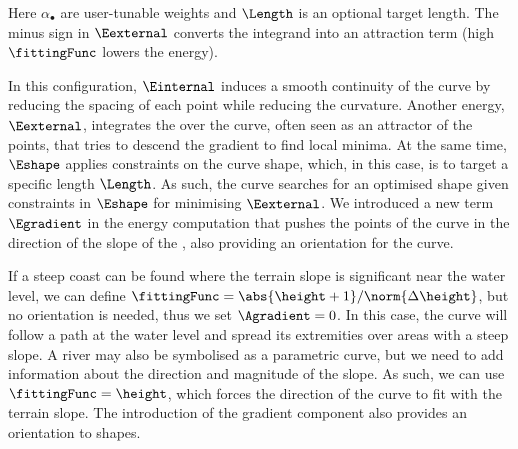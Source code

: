 Here $\alpha_{\bullet}$ are user-tunable weights and $\Length$ is an optional target length. The minus sign in $\Eexternal$ converts the integrand into an attraction term (high $\fittingFunc$ lowers the energy).

In this configuration, $\Einternal$ induces a smooth continuity of the curve by reducing the spacing of each point while reducing the curvature. Another energy, $\Eexternal$, integrates the  over the curve, often seen as an attractor of the points, that tries to descend the gradient to find local minima. At the same time, $\Eshape$ applies constraints on the curve shape, which, in this case, is to target a specific length $\Length$. As such, the curve searches for an optimised shape given constraints in $\Eshape$ for minimising $\Eexternal$. We introduced a new term $\Egradient$ in the energy computation that pushes the points of the curve in the direction of the slope of the , also providing an orientation for the curve.

If a steep coast can be found where the terrain slope is significant near the water level, we can define $\fittingFunc = \abs{\height + 1} / \norm{\Delta \height}$, but no orientation is needed, thus we set $\Agradient = 0$. In this case, the curve will follow a path at the water level and spread its extremities over areas with a steep slope. A river may also be symbolised as a parametric curve, but we need to add information about the direction and magnitude of the slope. As such, we can use $\fittingFunc = \height$, which forces the direction of the curve to fit with the terrain slope. The introduction of the gradient component also provides an orientation to shapes.



